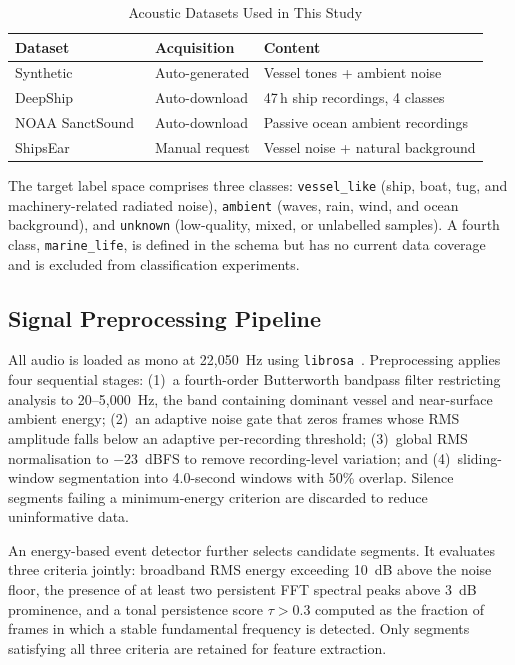 \documentclass[conference]{IEEEtran}
\begin{document}
\begin{table}[h]
\caption{Acoustic Datasets Used in This Study}
\label{tab:datasets}
\centering
\renewcommand{\arraystretch}{1.2}
\begin{tabular}{lll}
\toprule
\textbf{Dataset} & \textbf{Acquisition} & \textbf{Content} \\
\midrule
Synthetic             & Auto-generated  & Vessel tones + ambient noise \\
DeepShip~\cite{deepship} & Auto-download & 47\,h ship recordings, 4 classes \\
NOAA SanctSound~\cite{noaa} & Auto-download & Passive ocean ambient recordings \\
ShipsEar              & Manual request  & Vessel noise + natural background \\
\bottomrule
\end{tabular}
\end{table}

The target label space comprises three classes: \texttt{vessel\_like} (ship, boat, tug, and machinery-related radiated noise), \texttt{ambient} (waves, rain, wind, and ocean background), and \texttt{unknown} (low-quality, mixed, or unlabelled samples). A fourth class, \texttt{marine\_life}, is defined in the schema but has no current data coverage and is excluded from classification experiments.

\subsection{Signal Preprocessing Pipeline}

All audio is loaded as mono at 22,050~Hz using \texttt{librosa}~\cite{librosa}. Preprocessing applies four sequential stages: (1)~a fourth-order Butterworth bandpass filter restricting analysis to 20--5,000~Hz, the band containing dominant vessel and near-surface ambient energy; (2)~an adaptive noise gate that zeros frames whose RMS amplitude falls below an adaptive per-recording threshold; (3)~global RMS normalisation to $-23$~dBFS to remove recording-level variation; and (4)~sliding-window segmentation into 4.0-second windows with 50\% overlap. Silence segments failing a minimum-energy criterion are discarded to reduce uninformative data.

An energy-based event detector further selects candidate segments. It evaluates three criteria jointly: broadband RMS energy exceeding 10~dB above the noise floor, the presence of at least two persistent FFT spectral peaks above 3~dB prominence, and a tonal persistence score $\tau > 0.3$ computed as the fraction of frames in which a stable fundamental frequency is detected. Only segments satisfying all three criteria are retained for feature extraction.
\end{document}
